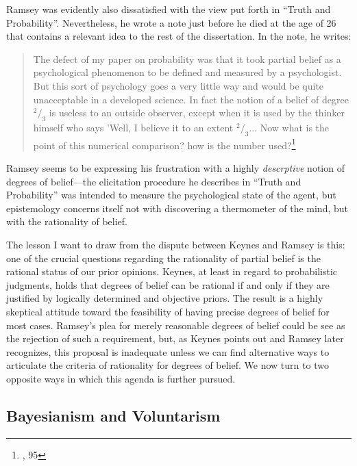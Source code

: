 Ramsey was evidently also dissatisfied with the view put forth in ``Truth and Probability''. Nevertheless, he wrote a note just before he died at the age of 26 that contains a relevant idea to the rest of the dissertation. In the note, he writes:

\begin{quote}
The defect of my paper on probability was that it took partial belief as a psychological phenomenon to be defined and measured by a psychologist. But this sort of psychology goes a very little way and would be quite unacceptable in a developed science. In fact the notion of a belief of degree $^2/_3$ is useless to an outside observer, except when it is used by the thinker himself who says 'Well, I believe it to an extent $^2/_3$... Now what is the point of this numerical comparison? how is the number used?\footnote{\cite{ramsey}, 95}
\end{quote}

Ramsey seems to be expressing his frustration with a highly \emph{descrptive} notion of degrees of belief---the elicitation procedure he describes in ``Truth and Probability'' was intended to measure the psychological state of the agent, but epistemology concerns itself not with discovering a thermometer of the mind, but with the rationality of belief. 

The lesson I want to draw from the dispute between Keynes and Ramsey is
this: one of the crucial questions regarding the rationality of partial
belief is the rational status of our prior opinions. Keynes, at least in
regard to probabilistic judgments, holds that degrees of belief can be
rational if and only if they are justified by logically
determined and objective priors. The result is a highly skeptical
attitude toward the feasibility of having precise degrees of belief for
most cases. Ramsey's plea for merely reasonable degrees of belief could
be see as the rejection of such a requirement, but, as Keynes points out and Ramsey later recognizes,
this proposal is inadequate unless we can find alternative ways to
articulate the criteria of rationality for degrees of belief. We now turn to two opposite ways in which this agenda is further pursued.



\hypertarget{bayesianism-and-voluntarism}{%
\subsection{Bayesianism and
Voluntarism}\label{sec:bayesianism-and-voluntarism}}

